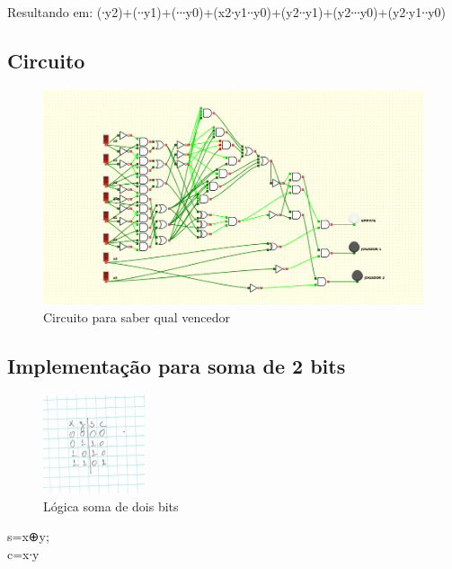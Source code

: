 \documentclass{article}
\begin{document}
Resultando em: (∙y2)+(∙∙y1)+(∙∙∙y0)+(x2∙y1∙∙y0)+(y2∙∙y1)+(y2∙∙∙y0)+(y2∙y1∙∙y0)

\subsection{Circuito}
\begin{figure}[!h]
\centering
\includegraphics[width=15cm]{c1.png}
\caption{Circuito para saber qual vencedor}
\label{fig:CL_logo}
\end{figure}

\subsection{Implementação para soma de 2 bits}

\begin{figure}[!h]
\centering
\includegraphics[width=3cm]{somaSimples.jpeg}
\caption{Lógica soma de dois bits}
\label{fig:CL_logo}
\end{figure}

s=x⊕y;
\\
c=x∙y
\end{document}

